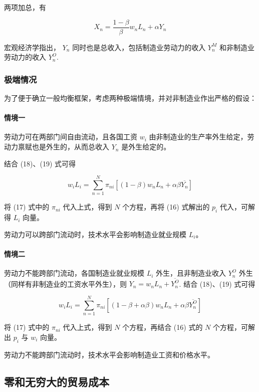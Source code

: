 \documentclass[
]{article}
\begin{document}
两项加总，有

\[
X_{n}=\frac{1-\beta}{\beta} w_{n} L_{n}+\alpha Y_{n} \tag{19}
\]

宏观经济学指出， \(Y_n\) 同时也是总收入，包括制造业劳动力的收入 \(Y_n^M\)
和非制造业劳动力的收入 \(Y_n^O\).

\hypertarget{ux6781ux7aefux60c5ux51b5}{%
\subsubsection{极端情况}\label{ux6781ux7aefux60c5ux51b5}}

为了便于确立一般均衡框架，考虑两种极端情境，并对非制造业作出严格的假设：

\hypertarget{ux60c5ux5883ux4e00}{%
\paragraph{情境一}\label{ux60c5ux5883ux4e00}}

劳动力可在两部门间自由流动，且各国工资 \(w_i\)
由非制造业的生产率外生给定，劳动力禀赋也是外生的，从而总收入 \(Y_n\)
是外生给定的。

结合 (18)、(19) 式可得

\[
w_{i} L_{i}=\sum_{n=1}^{N} \pi_{n i}\left[(1-\beta) w_{n} L_{n}+\alpha \beta \overline{Y_n}\right] \tag{20}
\]

将 (17) 式中的 \(\pi_{ni}\) 代入上式，得到 \(N\) 个方程，再将 (16) 式解出的 \(p_i\)
代入，可解得 \(L_{i}\) 向量。

劳动力可以跨部门流动时，技术水平会影响制造业就业规模 \(L_{i}\)。

\hypertarget{ux60c5ux5883ux4e8c}{%
\paragraph{情境二}\label{ux60c5ux5883ux4e8c}}

劳动力不能跨部门流动，各国制造业就业规模 \(L_{i}\) 外生，且非制造业收入
\(Y_n^O\) 外生（同样有非制造业的工资水平外生），则
\(Y_n=w_nL_n+\overline{Y_n^O}\). 结合 (18)、(19) 式可得

\[
w_{i} L_{i}=\sum_{n=1}^{N} \pi_{n i}\left[(1-\beta+\alpha \beta) w_{n} L_{n}+\alpha \beta \overline{Y_n^O}\right] \tag{21}
\]

将 (17) 式中的 \(\pi_{ni}\) 代入上式，得到 \(N\) 个方程，再结合 (16) 式的 \(N\) 个方程，可解出 \(p_i\) 与 \(w_{i}\) 向量。

劳动力不能跨部门流动时，技术水平会影响制造业工资和价格水平。

\hypertarget{ux96f6ux548cux65e0ux7a77ux5927ux7684ux8d38ux6613ux6210ux672c}{%
\subsection{零和无穷大的贸易成本}\label{ux96f6ux548cux65e0ux7a77ux5927ux7684ux8d38ux6613ux6210ux672c}}
\end{document}
